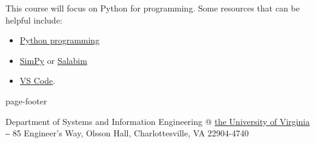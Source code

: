\documentclass[11pt, a4paper]{article}
\begin{document}
This course will focus on Python for programming. Some resources that can be helpful include:
\begin{itemize}
\item  \href{https://www.datacamp.com/courses/intro-to-python-for-data-science}{Python programming} 

\item \href{https://simpy.readthedocs.io/en/latest/simpy_intro/index.html}{SimPy} or \href{https://salabim.org/manual/salabim.pdf}{Salabim}

\item \href{https://code.visualstudio.com/docs}{VS Code}. 
\end{itemize}

\vfill

\begin{BlockClass}{page-footer}
\begin{center}
    \small
    Department of Systems and Information Engineering @ \href{http://www.virginia.edu}{the University of Virginia} ‒ 85 Engineer's Way, Olsson Hall, Charlottesville, VA 22904-4740
\end{center}
\end{BlockClass}
\end{document}
